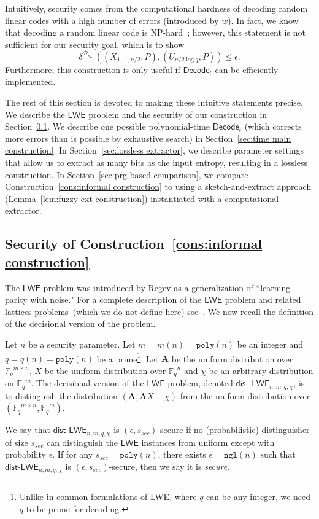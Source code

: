 \documentclass{llncs}
\newcommand{\secref}[1]{\mbox{Section~\ref{#1}}}
\newcommand{\lemref}[1]{\mbox{Lemma~\ref{#1}}}
\newcommand{\consref}[1]{\mbox{Construction~\ref{#1}}}
\newcommand{\class}[1]{{\ensuremath{\mathsf{#1}}}}
\newcommand{\vect}[1]{\ensuremath{\mathbf{#1}}}
\newcommand{\Fq}{\ensuremath{\mathbb{F}_q}}
\newcommand{\decode}{\ensuremath{\mathsf{Decode}}}
\newcommand{\poly}{\ensuremath{\mathtt{poly}}\xspace}
\newcommand{\ngl}{\ensuremath{\mathtt{ngl}}\xspace}
\newcommand{\lwe}{\class{LWE}}
\newcommand{\LWE}{\class{LWE}}
\newcommand{\distLWE}{\ensuremath{\class{dist\mbox{-}LWE}}}
\newcommand{\vA}{\vect{A}}
\begin{document}
Intuitively, security comes from the computational hardness of decoding random linear codes with a high number of errors (introduced by $w$).  
In fact, we know that decoding a random linear code is NP-hard~\cite{berlekamp1978}; however, this statement is not sufficient for our security goal, which is to show  \[\delta^{\mathcal{D}_{s_{sec}}}((X_{1,..., n/2},P), (U_{n/2 \log q}, P))\leq \epsilon.\]  Furthermore, this construction is only useful if $\decode_t$ can be efficiently implemented. 

The rest of this section is devoted to making these intuitive statements precise.
 We describe the \class{LWE} problem and the security of our construction in \secref{subsec:LWE}.
We describe one possible polynomial-time $\decode_t$ (which corrects more errors than is possible by exhaustive search) in \secref{sec:time main construction}.  In \secref{sec:lossless extractor}, we describe parameter settings that allow us to extract as many bits as the input entropy, resulting in a lossless construction.  In \secref{sec:prg based comparison}, we compare \consref{cons:informal construction} to using a sketch-and-extract approach (\lemref{lem:fuzzy ext construction}) instantiated with a computational extractor. 

\subsection{Security of \consref{cons:informal construction}}
\label{subsec:LWE}
The $\LWE$ problem was introduced by Regev \cite{regev2005LWE,regevLWEsurvey} as a generalization of ``learning parity with noise." For a complete description of the $\LWE$ problem and related lattices problems~(which we do not define here) see~\cite{regev2005LWE}.  We now recall the definition of the decisional version of the problem. 


\begin{definition}[Decisional $\lwe$]\label{def:dist-LWE}
Let $n$ be a security parameter.  
Let $m = m(n) = \poly(n)$ be an integer and $q = q(n) = \poly(n)$ be a prime\footnote{%
Unlike in common formulations of LWE, where $q$ can be any integer, we need $q$ to be prime for decoding.}.
%
Let $\vA$ be the uniform distribution over  $\Fq^{m\times n}$, $X$ be the uniform distribution over $\Fq^n$ and $\chi$ be an arbitrary distribution on $\Fq^m$.
 The decisional version of the $\LWE$ problem, denoted \class{dist}-$\LWE_{n, m, q, \chi}$, is to distinguish the distribution
$(\vA, \vA X+\chi)$ from
 the uniform distribution over $(\Fq^{m\times n}, \Fq^m)$.

We say that $\distLWE_{n, m, q, \chi}$ is $(\epsilon, s_{sec})$-secure if no (probabilistic) distinguisher of size $s_{sec}$ can distinguish the $\lwe$ instances from uniform except with probability $\epsilon$.  If for any $s_{sec} = \poly(n)$, there exists   $\epsilon  = \ngl(n)$ such that  $\distLWE_{n, m, q, \chi}$ is $(\epsilon, s_{sec})$-secure, then we say  it is \emph{secure}.
\end{definition}
\end{document}
